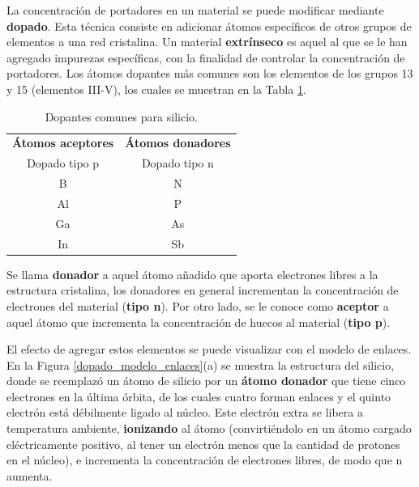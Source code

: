 La concentración de portadores en un material se puede modificar mediante \textbf{dopado}. Esta técnica consiste en adicionar átomos específicos de otros grupos de elementos a una red cristalina. 
Un material \textbf{extrínseco} es aquel al que se le han agregado impurezas específicas, con la finalidad de controlar la concentración de portadores. Los átomos dopantes más comunes son los elementos de los grupos 13 y 15 (elementos III-V), los cuales se muestran en la Tabla \ref{tabla_atomos_dopantes}. 

\begin{table}[H]
    \centering
    \caption{Dopantes comunes para silicio.}
    \label{tabla_atomos_dopantes}
    \begin{tabular}{|c|c|}
        \hline \textbf{Átomos aceptores} & \textbf{Átomos donadores} \\
        Dopado tipo p & Dopado tipo n \\
        \hline
        B  & N \\
        Al & P \\
        Ga & As \\
        In & Sb \\
        \hline
    \end{tabular}
\end{table}

Se llama \textbf{donador} a aquel átomo añadido que aporta electrones libres a la estructura cristalina, los donadores en general incrementan la concentración de electrones del material (\textbf{tipo n}). Por otro lado, se le conoce como \textbf{aceptor} a aquel átomo que incrementa la concentración de huecos al material (\textbf{tipo p}).

El efecto de agregar estos elementos se puede visualizar con el modelo de enlaces. En la Figura \ref{dopado_modelo_enlaces}(a) se muestra la estructura del silicio, donde se reemplazó un átomo de silicio por un \textbf{átomo donador} que tiene cinco electrones en la última órbita, de los cuales cuatro forman enlaces y el quinto electrón está débilmente ligado al núcleo. Este electrón extra se libera a temperatura ambiente, \textbf{ionizando} al átomo (convirtiéndolo en un átomo cargado eléctricamente positivo, al tener un electrón menos que la cantidad de protones en el núcleo), e incrementa la concentración de electrones libres, de modo que n aumenta. 

